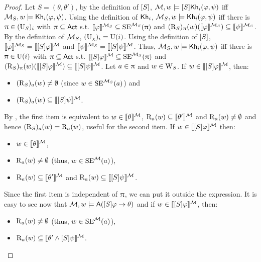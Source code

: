 \begin{proof}
	Let $S = (\theta,\theta')$, by the definition of $[S]$, $\mathcal{M},w \models [S]{\sf Kh}_i(\varphi,\psi)$ iff $\mathcal{M}_{{S}},w \models {\sf Kh}_i(\varphi,\psi)$.
	Using the definition of ${\sf Kh}_i$, $\mathcal{M}_{{S}},w \models {\sf Kh}_i(\varphi,\psi)$ iff there is $\uppi \in (\operatorname{U}_{{S}})_i$ with $\uppi \subseteq {\rm \sf Act}$ s.t. $\llbracket \varphi \rrbracket^{\mathcal{M}_{{S}}} \subseteq \operatorname{SE}^{\mathcal{M}_{{S}}}(\uppi)$ and $(\operatorname{R}_{{S}})_\uppi(w)(\llbracket \varphi \rrbracket^{\mathcal{M}_{{S}}}) \subseteq \llbracket \psi \rrbracket^{\mathcal{M}_{{S}}}$.
	By the definition of $\mathcal{M}_{{S}}$, $(\operatorname{U}_{{\chi}})_i=\operatorname{U}(i)$. Using the definition of $[S]$, $\llbracket \varphi \rrbracket^{\mathcal{M}_{{S}}} = \llbracket [S]\varphi \rrbracket^{\mathcal{M}}$ and $\llbracket \psi \rrbracket^{\mathcal{M}_{{S}}} = \llbracket [S]\psi \rrbracket^{\mathcal{M}}$.
	Thus, $\mathcal{M}_{{S}},w \models {\sf Kh}_i(\varphi,\psi)$ iff there is $\uppi \in \operatorname{U}(i)$ with $\uppi \subseteq {\rm \sf Act}$ s.t. $\llbracket [S]\varphi \rrbracket^{\mathcal{M}} \subseteq \operatorname{SE}^{\mathcal{M}_{{S}}}(\uppi)$ and $(\operatorname{R}_{{S}})_\uppi(w)(\llbracket [S]\varphi \rrbracket^{\mathcal{M}}) \subseteq \llbracket [S]\psi \rrbracket^{\mathcal{M}}$.
	Let $a \in \uppi$ and $w \in \operatorname{W}_{{S}}$. If $w \in \llbracket [S]\varphi \rrbracket^{\mathcal{M}}$, then:
	\begin{itemize}
	\item $(\operatorname{R}_{{S}})_a(w) \neq \emptyset$ (since $w \in \operatorname{SE}^{\mathcal{M}_{{S}}}(a)$) and
	\item $(\operatorname{R}_{{S}})_a(w) \subseteq \llbracket [S]\psi \rrbracket^{\mathcal{M}}$.
	\end{itemize}
	By , the first item is equivalent to $w \in \llbracket \theta \rrbracket^{\mathcal{M}}$, $\operatorname{R}_a(w) \subseteq \llbracket \theta' \rrbracket^{\mathcal{M}}$ and $\operatorname{R}_a(w) \neq \emptyset$ and hence $(\operatorname{R}_{{S}})_a(w) = \operatorname{R}_a(w)$, useful for the second item.
	If $w \in \llbracket [S]\varphi \rrbracket^{\mathcal{M}}$ then:
	\begin{itemize}
	\item $w \in \llbracket \theta \rrbracket^{\mathcal{M}}$,
	\item $\operatorname{R}_a(w) \neq \emptyset$ (thus, $w \in \operatorname{SE}^{\mathcal{M}}(a)$),
	\item $\operatorname{R}_a(w) \subseteq \llbracket \theta' \rrbracket^{\mathcal{M}}$ and $\operatorname{R}_a(w) \subseteq \llbracket [S]\psi \rrbracket^{\mathcal{M}}$.
	\end{itemize}
	Since the first item is independent of $\uppi$, we can put it outside the expression.
	It is easy to see now that $\mathcal{M},w \models {\sf A}([S]\varphi \rightarrow \theta)$ and if $w \in \llbracket [S]\varphi \rrbracket^{\mathcal{M}}$, then:
	\begin{itemize}
	\item $\operatorname{R}_a(w) \neq \emptyset$ (thus, $w \in \operatorname{SE}^{\mathcal{M}}(a)$),
	\item $\operatorname{R}_a(w) \subseteq \llbracket \theta' \wedge [S]\psi \rrbracket^{\mathcal{M}}$.
	\end{itemize}
	

\end{proof}
